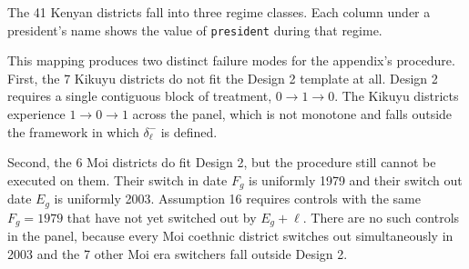 The 41 Kenyan districts fall into three regime classes. Each column under a president's name shows the value of \texttt{president} during that regime.
\begin{center}
\end{center}

This mapping produces two distinct failure modes for the appendix's procedure. First, the 7 Kikuyu districts do not fit the Design 2 template at all. Design 2 requires a single contiguous block of treatment, $0 \to 1 \to 0$. The Kikuyu districts experience $1 \to 0 \to 1$ across the panel, which is not monotone and falls outside the framework in which $\delta^-_\ell$ is defined.

Second, the 6 Moi districts do fit Design 2, but the procedure still cannot be executed on them. Their switch in date $F_g$ is uniformly 1979 and their switch out date $E_g$ is uniformly 2003. Assumption 16 requires controls with the same $F_g = 1979$ that have not yet switched out by $E_g + \ell$. There are no such controls in the panel, because every Moi coethnic district switches out simultaneously in 2003 and the 7 other Moi era switchers fall outside Design 2.\\

